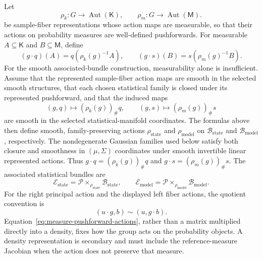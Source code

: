 Let
\begin{equation}
\rho_k:G\longrightarrow\operatorname{Aut}(\mathsf K),
\qquad
\rho_m:G\longrightarrow\operatorname{Aut}(\mathsf M).
\label{eq:sample-representations}
\end{equation}
be sample-fiber representations whose action maps are measurable, so that their actions on probability measures are well-defined pushforwards. For measurable \(A\subseteq\mathsf K\) and \(B\subseteq\mathsf M\), define
\begin{equation}
(g\mathbin{\cdot}q)(A)=q\left(\rho_k(g)^{-1}A\right),
\qquad
(g\mathbin{\cdot}s)(B)=s\left(\rho_m(g)^{-1}B\right).
\label{eq:measure-pushforward-actions}
\end{equation}
For the smooth associated-bundle construction, measurability alone is insufficient. Assume that the represented sample-fiber action maps are smooth in the selected smooth structures, that each chosen statistical family is closed under its represented pushforward, and that the induced maps
\begin{equation}
(g,q)\longmapsto(\rho_k(g))_{\#}q,
\qquad
(g,s)\longmapsto(\rho_m(g))_{\#}s
\label{eq:smooth-statistical-actions}
\end{equation}
are smooth in the selected statistical-manifold coordinates. The formulas above then define smooth, family-preserving actions \(\rho_{\mathrm{state}}\) and \(\rho_{\mathrm{model}}\) on \(\mathcal B_{\mathrm{state}}\) and \(\mathcal B_{\mathrm{model}}\), respectively. The nondegenerate Gaussian families used below satisfy both closure and smoothness in \((\mu,\Sigma)\) coordinates under smooth invertible linear represented actions. Thus \(g\mathbin{\cdot}q=(\rho_k(g))_{\#}q\) and \(g\mathbin{\cdot}s=(\rho_m(g))_{\#}s\). The associated statistical bundles are
\begin{equation}
\mathcal E_{\mathrm{state}}
=\mathcal P\times_{\rho_{\mathrm{state}}}\mathcal B_{\mathrm{state}},
\qquad
\mathcal E_{\mathrm{model}}
=\mathcal P\times_{\rho_{\mathrm{model}}}\mathcal B_{\mathrm{model}}.
\label{eq:associated-statistical-bundles}
\end{equation}
For the right principal action and the displayed left fiber actions, the quotient convention is
\begin{equation}
(u\mathbin{\cdot}g,b)\sim(u,g\mathbin{\cdot}b).
\label{eq:associated-bundle-quotient-convention}
\end{equation}
Equation~\eqref{eq:measure-pushforward-actions}, rather than a matrix multiplied directly into a density, fixes how the group acts on the probability objects. A density representation is secondary and must include the reference-measure Jacobian when the action does not preserve that measure.

